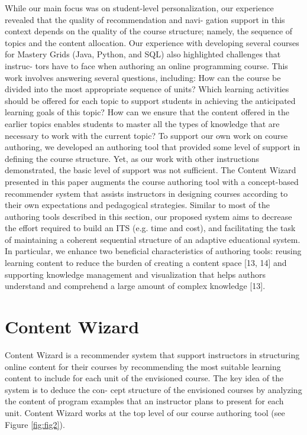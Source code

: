 \documentclass{sig-alternate}
\begin{document}
While our main focus was on student-level personalization, our
experience revealed that the quality of recommendation and navi-
gation support in this context depends on the quality of the course
structure; namely, the sequence of topics and the content allocation.
Our experience with developing several courses for Mastery Grids
(Java, Python, and SQL) also highlighted challenges that instruc-
tors have to face when authoring an online programming course.
This work involves answering several questions, including: How
can the course be divided into the most appropriate sequence of
units? Which learning activities should be offered for each topic to
support students in achieving the anticipated learning goals of this
topic? How can we ensure that the content offered in the earlier
topics enables students to master all the types of knowledge that
are necessary to work with the current topic? To support our own
work on course authoring, we developed an authoring tool that
provided some level of support in defining the course structure. Yet,
as our work with other instructions demonstrated, the basic level
of support was not sufficient. The Content Wizard presented in this
paper augments the course authoring tool with a concept-based
recommender system that assists instructors in designing courses
according to their own expectations and pedagogical strategies.
Similar to most of the authoring tools described in this section,
our proposed system aims to decrease the effort required to build
an ITS (e.g. time and cost), and facilitating the task of maintaining a
coherent sequential structure of an adaptive educational system. In
particular, we enhance two beneficial characteristics of authoring
tools: reusing learning content to reduce the burden of creating
a content space [13, 14] and supporting knowledge management and visualization that helps authors understand and comprehend a
large amount of complex knowledge [13].

\section{Content Wizard}

Content Wizard is a recommender system that support instructors
in structuring online content for their courses by recommending
the most suitable learning content to include for each unit of the
envisioned course. The key idea of the system is to deduce the con-
cept structure of the envisioned courses by analyzing the content of
program examples that an instructor plans to present for each unit.
Content Wizard works at the top level of our course authoring tool
(see Figure \ref{fig:fig2}).
\end{document}
